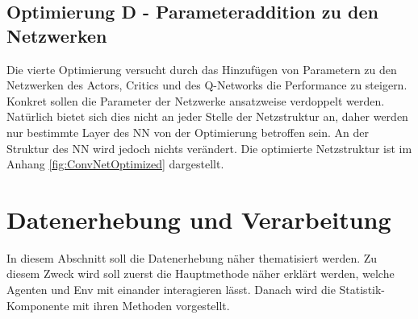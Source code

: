 \subsection{Optimierung D - Parameteraddition zu den Netzwerken} \label{sec:Konzept_Optimierung04}
Die vierte Optimierung versucht durch das Hinzufügen von Parametern zu den Netzwerken des Actors, Critics und des Q-Networks die Performance zu steigern. Konkret sollen die Parameter der Netzwerke ansatzweise verdoppelt werden. Natürlich bietet sich dies nicht an jeder Stelle der Netzstruktur an, daher werden nur bestimmte Layer des NN von der Optimierung betroffen sein. An der Struktur des NN wird jedoch nichts verändert. Die optimierte Netzstruktur ist im Anhang \ref{fig:ConvNetOptimized} dargestellt. 


\section{Datenerhebung und Verarbeitung} \label{sec:Konzept_Datenerhebung_Verarbeitung}
In diesem Abschnitt soll die Datenerhebung näher thematisiert werden. Zu diesem Zweck wird soll zuerst die Hauptmethode näher erklärt werden, welche Agenten und Env mit einander interagieren lässt. Danach wird die Statistik-Komponente mit ihren Methoden vorgestellt.

